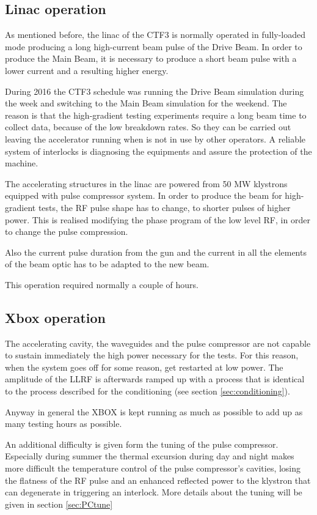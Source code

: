\subsection{Linac operation}

As mentioned before, the linac of the CTF3 is normally operated in fully-loaded mode producing a long  high-current beam pulse of the Drive Beam. In order to produce the Main Beam, it is necessary to produce a short beam pulse with a lower current and a resulting higher energy. 

During 2016 the CTF3 schedule was running the Drive Beam simulation during the week and switching to the Main Beam simulation for the weekend. The reason is that the high-gradient testing experiments require a long beam time to collect data, because of the low breakdown rates. So they can be carried out leaving the accelerator running when is not in use by other operators. A reliable system of interlocks is diagnosing the equipments and assure the protection of the machine.

The accelerating structures in the linac are powered from 50 MW klystrons equipped with pulse compressor system. 
In order to produce the beam for high-gradient tests, the RF pulse shape has to change, to shorter pulses of higher power. This is realised modifying the phase program of the low level RF, in order to change the pulse compression. 

Also the current pulse duration from the gun and the current in all the elements of the beam optic has to be adapted to the new beam.

This operation required normally a couple of hours.


\subsection{Xbox operation}

The accelerating cavity, the waveguides and the pulse compressor are not capable to sustain immediately the high power necessary for the tests. For this reason, when the system goes off for some reason, get restarted at low power. The amplitude of the LLRF is afterwards ramped up with a process that is identical to the process described for the conditioning (see section \ref{sec:conditioning}).

Anyway in general the XBOX is kept running as much as possible to add up as many testing hours as possible.

An additional difficulty is given form the tuning of the pulse compressor. Especially during summer the thermal excursion during day and night makes more difficult the temperature control of the pulse compressor's cavities, losing the flatness of the RF pulse and an enhanced reflected power to the klystron that can degenerate in triggering an interlock. More details about the tuning will be given in section \ref{sec:PCtune}